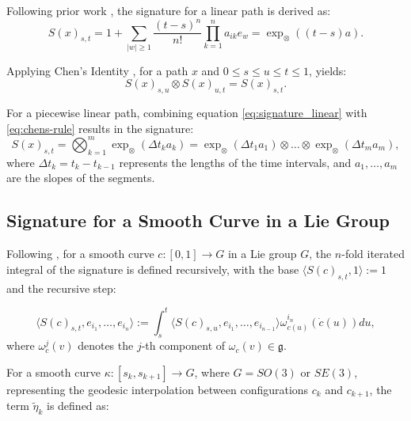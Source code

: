 Following prior work \cite{reizensteinCalculationIteratedIntegralSignatures2017, celledoniSignaturesShapeAnalysis2019}, the signature for a linear path is derived as:
\begin{equation}
S(x)_{s,t} = 1 + \sum_{|w|\geq 1} \frac{(t-s)^n}{n!} \prod^n_{k=1} a_{ik}e_w = \exp_{\otimes}((t-s)a).
\label{eq:signature_linear}
\end{equation}

Applying Chen's Identity \cite{chenIteratedIntegralsExponential1954}, for a path \(x\) and \(0 \leq s \leq u \leq t \leq 1\), yields:
\begin{equation}
S(x)_{s,u} \otimes S(x)_{u,t} = S(x)_{s,t}.
\label{eq:chens-rule}
\end{equation}

For a piecewise linear path, combining equation \eqref{eq:signature_linear} with \eqref{eq:chens-rule} results in the signature:
\begin{equation}
S(x)_{s,t} = \bigotimes_{k=1}^{m} \exp_{\otimes}(\Delta t_k a_k) = \exp_{\otimes}(\Delta t_1a_1) \otimes \dots \otimes \exp_{\otimes}(\Delta t_ma_m),
\end{equation}
where \(\Delta t_k = t_k - t_{k-1}\) represents the lengths of the time intervals, and \(a_1, \ldots, a_m\) are the slopes of the segments.


\subsection{Signature for a Smooth Curve in a Lie Group}
\label{subsec:signature-lie-group}

Following \cite{celledoniSignaturesShapeAnalysis2019, leePathSignaturesLie2020}, for a smooth curve \( c: [0, 1] \to G \) in a Lie group \( G \), the \( n \)-fold iterated integral of the signature is defined recursively, with the base \(\langle S(c)_{s,t}, 1 \rangle := 1\) and the recursive step:

\begin{equation}
\langle S(c)_{s,t}, e_{i_1},\ldots,e_{i_n} \rangle := \int_{s}^{t} \langle S(c)_{s,u}, e_{i_1},\ldots,e_{i_{n-1}} \rangle \omega^{i_n}_{c(u)}( \dot{c}(u)) du,
\end{equation}
where \( \omega^{j}_{c}(v) \) denotes the \( j \)-th component of \( \omega_{c}(v) \in \mathfrak{g} \).

For a smooth curve \( \kappa: [s_k, s_{k+1}] \to G \), where \( G = SO(3) \) or \( SE(3) \), representing the geodesic interpolation between configurations \( c_k \) and \( c_{k+1} \), the term \( \tilde{\eta}_k \) is defined as:

